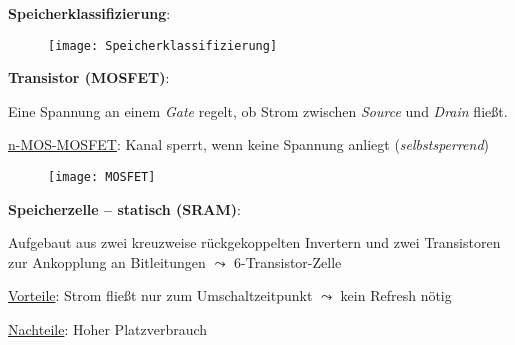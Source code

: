 \textbf{Speicherklassifizierung}:
\begin{figure}[H]\centering\label{Speicherklassifizierung}\texttt{[image: Speicherklassifizierung]}\end{figure}

\newpage

\textbf{Transistor (MOSFET)}:
\begin{items}
	\item Eine Spannung an einem \emph{Gate} regelt, ob Strom zwischen \emph{Source} und \emph{Drain} fließt.
	\item \underline{n-MOS-MOSFET}: Kanal sperrt, wenn keine Spannung anliegt (\emph{selbstsperrend})
\end{items}
\begin{figure}[H]\centering\label{MOSFET}\texttt{[image: MOSFET]}\end{figure}

\textbf{Speicherzelle -- statisch (SRAM)}:
\begin{items}
	\item Aufgebaut aus zwei kreuzweise rückgekoppelten Invertern und zwei Transistoren zur Ankopplung an Bitleitungen \( \leadsto \) 6-Transistor-Zelle
	\item \underline{Vorteile}: Strom fließt nur zum Umschaltzeitpunkt \( \leadsto \) kein Refresh nötig
	\item \underline{Nachteile}: Hoher Platzverbrauch
\end{items}

